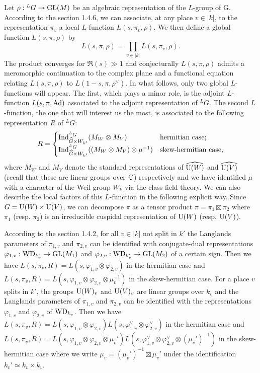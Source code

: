 Let $\rho: {}^L G \to \mathrm{GL}(M)$ be an algebraic representation of the $L$-group of G.
According to the section 1.4.6, we can associate, at any place $v \in |k|$, to the representation $\pi_v$ a local $L$-function $L(s, \pi_v, \rho)$.
We then define a global function $L(s, \pi, \rho)$ by
\[
    L(s, \pi, \rho) = \prod_{v \in |k|} L(s, \pi_v, \rho).
\]
The product converges for $\Re(s) \gg 1$ and conjecturally $L(s, \pi, \rho)$ admits a meromorphic continuation to the complex plane and a functional equation relating $L(s, \pi, \rho)$ to $L(1 - s, \pi, \rho^\vee)$.
In what follows, only two global $L$-functions will appear.
The first, which plays a minor role, is the adjoint $L$-function $L(s, \pi, \mathrm{Ad})$ associated to the adjoint representation of ${}^L G$.
The second $L$-function, the one that will interest us the most, is associated to the following representation $R$ of ${}^L G$:
\[
    R = \begin{cases} \mathrm{Ind}_{\widehat{G} \times W_{k'}}^{{}^L G}(M_W \otimes M_V) & \text{hermitian case}; \\
        \mathrm{Ind}_{\widehat{G} \times W_{k'}}^{{}^L G} ((M_W \otimes M_V) \otimes \mu^{-1}) & \text{skew-hermitian case},
    \end{cases}
\]
where $M_W$ and $M_V$ denote the standard representations of $\widehat{\mathrm{U}(W)}$ and $\widehat{\mathrm{U}(V)}$ (recall that these are linear groups over $\mathbb{C}$) respectively and we have identified $\mu$ with a character of the Weil group $W_k$ via the class field theory.
We can also describe the local factors of this $L$-function in the following explicit way.
Since $G = \mathrm{U}(W) \times \mathrm{U}(V)$, we can decompose $\pi$ as a tensor product $\pi = \pi_1 \boxtimes \pi_2$ where $\pi_1$ (resp. $\pi_2$) is an irreducible cuspidal representation of $\mathrm{U}(W)$ (resp. $\mathrm{U}(V)$).

According to the section 1.4.2, for all $v \in |k|$ not split in $k'$ the Langlands parameters of $\pi_{1, v}$ and $\pi_{2, v}$ can be identified with conjugate-dual representations $\varphi_{1, v}: \mathrm{WD}_{k_v'} \to \mathrm{GL}(M_1)$ and $\varphi_{2, v}: \mathrm{WD}_{k_v'} \to \mathrm{GL}(M_2)$ of a certain sign.
Then we have $L(s, \pi_v, R) = L(s, \varphi_{1, v} \otimes \varphi_{2, v})$ in the hermitian case and $L(s, \pi_v, R) = L(s, \varphi_{1, v} \otimes \varphi_{2, v} \otimes \mu_v^{-1})$ in the skew-hermitian case.
For a place $v$ splits in $k'$, the groups $\mathrm{U}(W)_v$ and $\mathrm{U}(V)_v$ are linear groups over $k_v$ and the Langlands parameters of $\pi_{1, v}$ and $\pi_{2, v}$ can be identified with the representations $\varphi_{1, v}$ and $\varphi_{2, v}$ of $\mathrm{WD}_{k_v}$.
Then we have $L(s, \pi_v, R) = L(s, \varphi_{1, v} \otimes \varphi_{2, v}) L(s, \varphi_{1, v}^\vee \otimes \varphi_{2, v}^\vee)$ in the hermitian case and $L(s, \pi_v, R) = L(s, \varphi_{1, v} \otimes \varphi_{2, v} \otimes \mu_{v}') L(s, \varphi_{1, v}^\vee \otimes \varphi_{2, v}^\vee \otimes (\mu_v')^{-1})$ in the skew-hermitian case where we write $\mu_v = (\mu_v')^{-1} \boxtimes \mu_v'$ under the identification $k_v' \simeq k_v \times k_v$.

